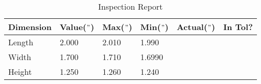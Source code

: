 \documentclass{article}
\begin{document}
\newpage

\begin{table}[ht]
\centering
\caption{Inspection Report}
\renewcommand\arraystretch{3}
\begin{tabular}{l | m{2cm} | m{2cm} | m{2cm} | m{2cm} | m{2cm} |}
	Dimension & Value($"$) & Max($"$) & Min($"$) & Actual($"$) & In Tol? \\
	\hline
	Length & 2.000 & 2.010 & 1.990 & & \\
	\hline
	Width & 1.700 & 1.710 & 1.6990 && \\
	\hline
	Height & 1.250 & 1.260 & 1.240 && \\
	\hline
\end{tabular}
\end{table}
\end{document}
